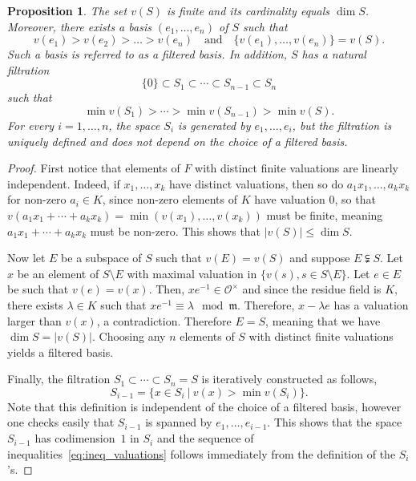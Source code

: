 \documentclass[10pt]{amsart}
\newtheorem{prop}[theo]{Proposition}
\theoremstyle{definition}
\theoremstyle{remark}
\newcommand*\OO{\mathcal{O}}
\newcommand*\m{\mathfrak m}
\renewcommand{\leq}{\leqslant}
\begin{document}
\begin{prop}\label{prop:filtered_basis}
The set $v(S)$ is finite and its cardinality equals $\dim S$. Moreover, there exists a basis $(e_1, \ldots, e_n)$ of $S$ such that
\[
v(e_1) > v(e_2) > \dots > v(e_n) \quad \text{and} \quad
\{v(e_1), \ldots, v(e_n)\}= v(S).
\]
Such a basis is referred to as
a \emph{filtered basis}. In addition, $S$ has a natural filtration
\[
\{0\} \subset S_1 \subset \cdots \subset S_{n-1} \subset S_n
\]
such that
\begin{equation}\label{eq:ineq_valuations}
\min v(S_1) > \cdots > \min v(S_{n-1}) > \min v (S).
\end{equation}
For every $i=1,\dots, n$, the space $S_i$ is generated by $e_1,\ldots ,e_i$, but the filtration is uniquely defined and does not depend on the choice of a filtered basis.
\end{prop}

\begin{proof}
First notice that elements of $F$ with distinct finite valuations are linearly independent. Indeed, if $x_1, \ldots, x_k$ have distinct valuations, then so do $a_1x_1,\ldots,a_kx_k$ for non-zero $a_i\in K$, since non-zero elements of $K$ have valuation $0$, so that $v(a_1 x_1 + \cdots + a_k x_k)=\min(v(x_1),\ldots, v(x_k))$ must be finite, meaning $a_1 x_1 + \cdots + a_k x_k$ must be non-zero. This shows that $|v(S)|\leq\dim S$.

Now let $E$ be a subspace of $S$ such that $v(E)=v(S)$ and suppose $E\subsetneqq S$. Let $x$ be an element of $S\setminus E$ with maximal valuation in $\{v(s), s\in S\setminus E\}$. Let $e\in E$ be such that $v(e)=v(x)$. Then, $xe^{-1} \in \OO^\times$ and since the residue field is $K$, there exists $\lambda \in K$ such that $xe^{-1} \equiv \lambda \mod \m$. Therefore, $x -\lambda e$ has a valuation larger than $v(x)$, a contradiction. Therefore $E=S$, meaning that we have $\dim S=|v(S)|$. Choosing any $n$ elements of $S$ with distinct finite valuations yields a filtered basis.

Finally, the filtration $S_1 \subset \cdots \subset S_n= S$ is iteratively constructed as follows,
\[
S_{i-1}=\{x \in S_i~|~v(x) > \min v(S_i)\}.
\]
Note that this definition is independent of the choice of a filtered basis, however one checks easily that $S_{i-1}$ is spanned by $e_1, \ldots, e_{i-1}$. This shows that the space $S_{i-1}$ has codimension~$1$ in $S_i$ and the sequence of inequalities~\eqref{eq:ineq_valuations} follows immediately from the definition of the $S_i$'s.
\end{proof}
\end{document}
